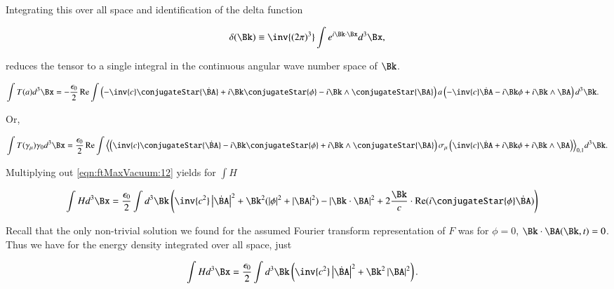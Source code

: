 Integrating this over all space and identification of the delta function

\begin{align}
\label{eqn:ftMaxVacuum:9}
\delta(\Bk) \equiv \inv{(2 \pi)^3} \int e^{i \Bk \cdot \Bx} d^3 \Bx,
\end{align}

reduces the tensor to a single integral in the continuous angular wave number space of $\Bk$.

\begin{align}
\label{eqn:ftMaxVacuum:10}
\int T(a) d^3 \Bx &= -\frac{\epsilon_0}{2} \Real \int
\left(
- \inv{c} \conjugateStar{\dot{\BA}}
+ i \Bk \conjugateStar{\phi}
- i \Bk \wedge \conjugateStar{\BA}
\right)
a
\left(
- \inv{c} \dot{\BA}
- i \Bk \phi
+ i \Bk \wedge \BA
\right)
d^3 \Bk.
\end{align}

Or,

\begin{align}
\label{eqn:ftMaxVacuum:12}
\int T(\gamma_\mu) \gamma_0 d^3 \Bx =
\frac{\epsilon_0}{2} \Real \int
\gpgrade{
\left(
\inv{c} \conjugateStar{\dot{\BA}}
- i \Bk \conjugateStar{\phi}
+ i \Bk \wedge \conjugateStar{\BA}
\right)
\sigma_\mu
\left(
\inv{c} \dot{\BA}
+ i \Bk \phi
+ i \Bk \wedge \BA
\right)
}{0,1}
d^3 \Bk.
\end{align}


Multiplying out \autoref{eqn:ftMaxVacuum:12} yields for $\int H$

\begin{align}
\label{eqn:ftMaxVacuum:14}
\int H d^3 \Bx &=
\frac{\epsilon_0}{2} \int d^3 \Bk \left(
\inv{c^2} \Abs{\dot{\BA}}^2 + \Bk^2 (\Abs{\phi}^2 + \Abs{\BA}^2 )
- \Abs{\Bk \cdot \BA}^2
+ 2 \frac{\Bk}{c} \cdot \Real( i \conjugateStar{\phi} \dot{\BA} )
\right)
\end{align}

Recall that the only non-trivial solution we found for the assumed Fourier transform representation of $F$ was for $\phi = 0$, $\Bk \cdot \BA(\Bk, t) = 0$.  Thus we have for the energy density integrated over all space, just

\begin{align}
\label{eqn:ftMaxVacuum:14b}
\int H d^3 \Bx &=
\frac{\epsilon_0}{2} \int d^3 \Bk \left(
\inv{c^2} \Abs{\dot{\BA}}^2 + \Bk^2 \Abs{\BA}^2 
\right).
\end{align}

